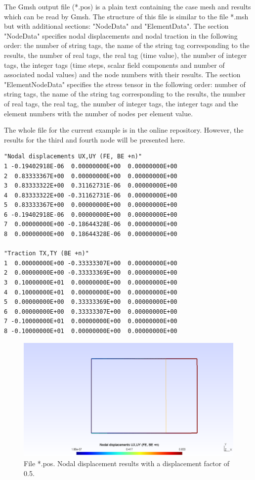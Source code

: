 \documentclass[A4]{article}
\begin{document}
The Gmsh output file (*.pos) is a plain text containing the case mesh and results which can be read by Gmsh. The structure of this file is similar to the file *.msh but with additional sections: "NodeData" and "ElementData". The section "NodeData" specifies nodal displacements and nodal traction in the following order: the number of string tags, the name of the string tag corresponding to the results, the number of real tags, the real tag (time value), the number of integer tags, the integer tags (time steps, scalar field components and number of associated nodal values) and the node numbers with their results. The section "ElementNodeData" specifies the stress tensor in the following order:
number of string tags, the name of the string tag corresponding to the results, the number of real tags, the real tag, the number of integer tags, the integer tags and the element numbers with the number of nodes per element value.

The whole file for the current example is in the online repository. However, the results for the third and fourth node will be presented here. 

\begin{Verbatim}
"Nodal displacements UX,UY (FE, BE +n)"
1 -0.19402918E-06  0.00000000E+00  0.00000000E+00
2  0.83333367E+00  0.00000000E+00  0.00000000E+00
3  0.83333322E+00  0.31162731E-06  0.00000000E+00
4  0.83333322E+00 -0.31162731E-06  0.00000000E+00
5  0.83333367E+00  0.00000000E+00  0.00000000E+00
6 -0.19402918E-06  0.00000000E+00  0.00000000E+00
7  0.00000000E+00 -0.18644328E-06  0.00000000E+00
8  0.00000000E+00  0.18644328E-06  0.00000000E+00

"Traction TX,TY (BE +n)"
1  0.00000000E+00 -0.33333307E+00  0.00000000E+00
2  0.00000000E+00 -0.33333369E+00  0.00000000E+00
3  0.10000000E+01  0.00000000E+00  0.00000000E+00
4  0.10000000E+01  0.00000000E+00  0.00000000E+00
5  0.00000000E+00  0.33333369E+00  0.00000000E+00
6  0.00000000E+00  0.33333307E+00  0.00000000E+00
7 -0.10000000E+01  0.00000000E+00  0.00000000E+00
8 -0.10000000E+01  0.00000000E+00  0.00000000E+00
\end{Verbatim}

\begin{figure}[h]
	\centering
	\includegraphics[scale = 0.5]{displacement.png}
	\caption{File *.pos. Nodal displacement results with a displacement factor of 0.5.}
	\label{fig:displacement}
\end{figure}
\end{document}
